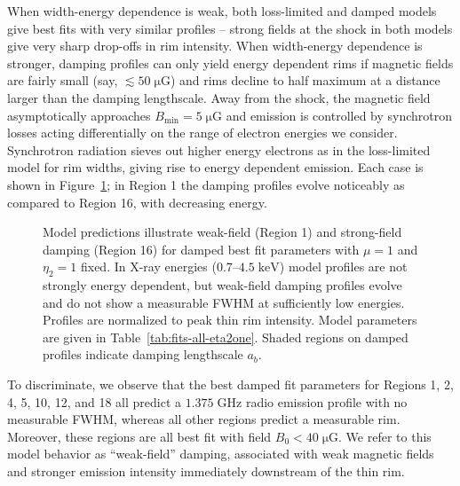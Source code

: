 \documentclass[iop, apj, numberedappendix]{emulateapj}
\newcommand*{\mt}{\mathrm}
\newcommand*{\unit}[1]{\;\mt{#1}}  %
\newcommand*{\muG}{\unit{\mu G}}
\begin{document}

When width-energy dependence is weak, both loss-limited and damped models give
best fits with very similar profiles -- strong fields at the shock in both models
give very sharp drop-offs in rim intensity.  When width-energy dependence is
stronger, damping profiles can only yield energy dependent rims if magnetic
fields are fairly small (say, $\lesssim 50 \muG$) and rims decline to half
maximum at a distance larger than the damping lengthscale.  Away from the
shock, the magnetic field asymptotically approaches $B_{\mt{min}} = 5 \muG$ and
emission is controlled by synchrotron losses acting differentially on
the range of electron energies we consider.  Synchrotron radiation sieves out
higher energy electrons as in the loss-limited model for rim widths, giving
rise to energy dependent emission.  Each case is shown in
Figure~\ref{fig:rims}; in Region 1 the damping profiles evolve noticeably as
compared to Region 16, with decreasing energy.


\begin{figure}
    \centering
    \iftoggle{manuscript}{
        \epsscale{0.7}
        \plotone{figures/prfs-fit-damp-01.pdf} \\
        \plotone{figures/prfs-fit-damp-16.pdf}
        \epsscale{1}
    }{
        \plotone{figures/prfs-fit-damp-01.pdf} \\
        \plotone{figures/prfs-fit-damp-16.pdf}
    }
    \caption{Model predictions illustrate weak-field (Region 1) and
        strong-field damping (Region 16) for damped best fit parameters with
        $\mu=1$ and $\eta_2=1$ fixed.  In X-ray energies ($0.7$--$4.5
        \unit{keV}$) model profiles are not strongly energy dependent, but
        weak-field damping profiles evolve and do not show a measurable FWHM at
        sufficiently low energies.
        Profiles are normalized to peak thin rim intensity.  Model parameters
        are given in Table~\ref{tab:fits-all-eta2one}.  Shaded regions on damped
        profiles indicate damping lengthscale $a_b$.
        \label{fig:rims}}
\end{figure}


To discriminate, we observe that the best damped fit parameters for Regions
1, 2, 4, 5, 10, 12, and 18 all predict a $1.375 \unit{GHz}$ radio emission
profile with no measurable FWHM, whereas all other regions predict a measurable
rim.  Moreover, these regions are all best fit with field $B_0 < 40 \muG$.
We refer to this model behavior as
``weak-field'' damping, associated with weak magnetic fields and stronger
emission intensity immediately downstream of the thin rim.
\end{document}
